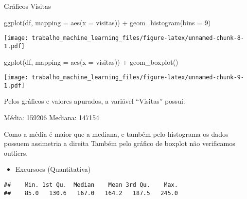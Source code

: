 \documentclass[
]{article}
\newenvironment{Shaded}{\begin{snugshade}}{\end{snugshade}}
\newcommand{\AttributeTok}[1]{\textcolor[rgb]{0.77,0.63,0.00}{#1}}
\newcommand{\DecValTok}[1]{\textcolor[rgb]{0.00,0.00,0.81}{#1}}
\newcommand{\FunctionTok}[1]{\textcolor[rgb]{0.00,0.00,0.00}{#1}}
\newcommand{\NormalTok}[1]{#1}
\newcommand{\SpecialCharTok}[1]{\textcolor[rgb]{0.00,0.00,0.00}{#1}}
\newcommand{\StringTok}[1]{\textcolor[rgb]{0.31,0.60,0.02}{#1}}
\providecommand{\tightlist}{%
  \setlength{\itemsep}{0pt}\setlength{\parskip}{0pt}}
\begin{document}
Gráficos Visitas

\begin{Shaded}
\begin{Highlighting}[]
\FunctionTok{ggplot}\NormalTok{(df, }\AttributeTok{mapping =} \FunctionTok{aes}\NormalTok{(}\AttributeTok{x =} \StringTok{\textasciigrave{}}\AttributeTok{visitas}\StringTok{\textasciigrave{}}\NormalTok{)) }\SpecialCharTok{+}
  \FunctionTok{geom\_histogram}\NormalTok{(}\AttributeTok{bins =} \DecValTok{9}\NormalTok{)}
\end{Highlighting}
\end{Shaded}

\texttt{[image: trabalho\_machine\_learning\_files/figure-latex/unnamed-chunk-8-1.pdf]}

\begin{Shaded}
\begin{Highlighting}[]
\FunctionTok{ggplot}\NormalTok{(df, }\AttributeTok{mapping =} \FunctionTok{aes}\NormalTok{(}\AttributeTok{x =} \StringTok{\textasciigrave{}}\AttributeTok{visitas}\StringTok{\textasciigrave{}}\NormalTok{)) }\SpecialCharTok{+}
  \FunctionTok{geom\_boxplot}\NormalTok{()}
\end{Highlighting}
\end{Shaded}

\texttt{[image: trabalho\_machine\_learning\_files/figure-latex/unnamed-chunk-9-1.pdf]}

Pelos gráficos e valores apurados, a variável ``Visitas'' possui:

Média: 159206 Mediana: 147154

Como a média é maior que a mediana, e também pelo histograma os dados
possuem assimetria a direita Também pelo gráfico de boxplot não
verificamos outliers.

\begin{itemize}
\tightlist
\item
  Excursoes (Quantitativa)
\end{itemize}

\begin{Shaded}
\end{Shaded}

\begin{verbatim}
##    Min. 1st Qu.  Median    Mean 3rd Qu.    Max. 
##    85.0   130.6   167.0   164.2   187.5   245.0
\end{verbatim}
\end{document}
